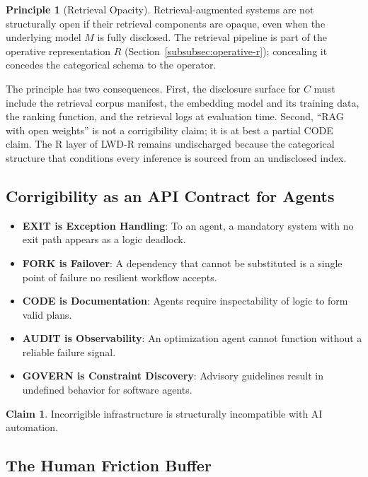\documentclass{article}
\theoremstyle{definition}
\newtheorem{principle}{Principle}[section]
\newtheorem{claim}{Claim}[section]
\begin{document}
\begin{principle}[Retrieval Opacity]
\label{prin:retrieval-opacity}
Retrieval-augmented systems are not structurally open if their retrieval components are opaque, even when the underlying model $M$ is fully disclosed. The retrieval pipeline is part of the operative representation $R$ (Section~\ref{subsubsec:operative-r}); concealing it concedes the categorical schema to the operator.
\end{principle}

The principle has two consequences. First, the disclosure surface for $C$ must include the retrieval corpus manifest, the embedding model and its training data, the ranking function, and the retrieval logs at evaluation time. Second, ``RAG with open weights'' is not a corrigibility claim; it is at best a partial CODE claim. The R layer of LWD-R remains undischarged because the categorical structure that conditions every inference is sourced from an undisclosed index.

\subsection{Corrigibility as an API Contract for Agents}

\begin{itemize}[noitemsep]
    \item \textbf{EXIT is Exception Handling}: To an agent, a mandatory system with no exit path appears as a logic deadlock.
    \item \textbf{FORK is Failover}: A dependency that cannot be substituted is a single point of failure no resilient workflow accepts.
    \item \textbf{CODE is Documentation}: Agents require inspectability of logic to form valid plans.
    \item \textbf{AUDIT is Observability}: An optimization agent cannot function without a reliable failure signal.
    \item \textbf{GOVERN is Constraint Discovery}: Advisory guidelines result in undefined behavior for software agents.
\end{itemize}

\begin{claim}
Incorrigible infrastructure is structurally incompatible with AI automation.
\end{claim}

\subsection{The Human Friction Buffer}
\end{document}
